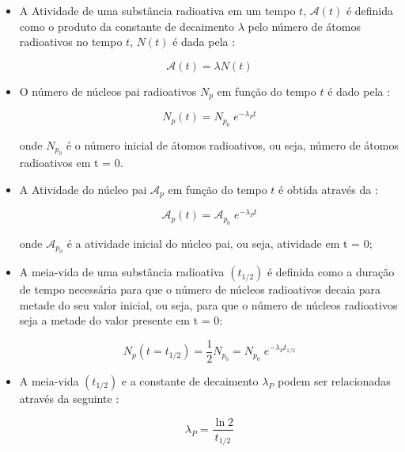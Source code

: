 \documentclass[11pt,a4paper]{article}
\begin{document}
    \begin{itemize}
		\item A Atividade de uma substância radioativa em um tempo $t$, $\mathcal{A}(t)$ é definida como o produto da constante de decaimento $\lambda$ pelo número de átomos radioativos no tempo $t$, $N(t)$ é dada pela :

			\begin{equation}
				\mathcal{A} (t) = \lambda N(t)
			\end{equation}

		\item O número de núcleos pai radioativos $N_p$ em função do tempo $t$ é dado pela :
			
			\begin{equation}
				N_p(t) = N_{p_0} \; e^{-\lambda_P t}
			\end{equation}

			onde $N_{p_0}$ é o número inicial de átomos radioativos, ou seja, número de átomos radioativos em t = 0.

		\item A Atividade do núcleo pai $\mathcal{A}_p$ em função do tempo $t$ é obtida através da :
		
			\begin{equation}
				\mathcal{A}_p(t) = \mathcal{A}_{p_0} \; e^{-\lambda_P t}
			\end{equation}
			
			onde $\mathcal{A}_{p_0}$ é a atividade inicial do núcleo pai, ou seja, atividade em t = 0;

		\item A meia-vida de uma substância radioativa $(t_{1/2})$ é definida como a duração de tempo necessária para que o número de núcleos radioativos decaia para metade do seu valor inicial, ou seja, para que o número de núcleos radioativos seja a metade do valor presente em t = 0:
		
			\begin{equation}
				N_p(t = t_{1/2}) = \frac{1}{2} N_{p_0} = N_{p_0} \; e^{-\lambda_P t_{1/2}}
			\end{equation}
		
		\item A meia-vida $(t_{1/2})$ e a constante de decaimento $\lambda_P$ podem ser relacionadas através da seguinte :
		
			\begin{equation}
				\lambda_P = \frac{\ln 2}{t_{1/2}}
			\end{equation}


\end{itemize}
\end{document}
